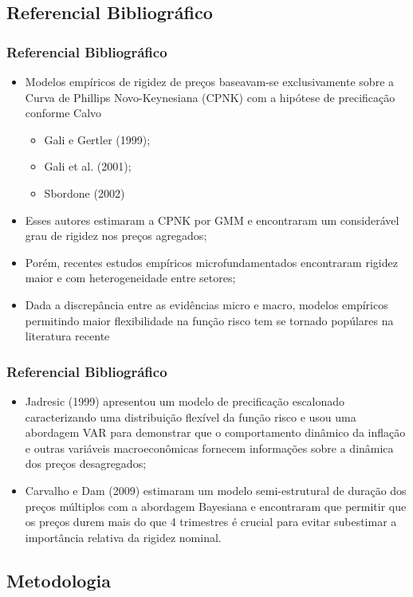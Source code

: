 \documentclass[aspectratio=169]{beamer}
\begin{document}
\subsection{Referencial Bibliográfico}

\begin{frame}\frametitle{Referencial Bibliográfico}
  \begin{itemize}[<+->]
  \item Modelos empíricos de rigidez de preços baseavam-se exclusivamente sobre a Curva de Phillips Novo-Keynesiana (CPNK) com a hipótese de precificação conforme Calvo
    \begin{itemize}
      \item Gali e Gertler (1999);
      \item Gali et al. (2001);
      \item Sbordone (2002)
    \end{itemize}
  \item Esses autores estimaram a CPNK por GMM e encontraram um considerável grau de rigidez nos preços agregados;
  \item Porém, recentes estudos empíricos microfundamentados encontraram rigidez maior e com heterogeneidade entre setores;
  \item Dada a discrepância entre as evidências micro e macro, modelos empíricos permitindo maior flexibilidade na função risco tem se tornado popúlares na literatura recente
  \end{itemize}
\end{frame}

\begin{frame}\frametitle{Referencial Bibliográfico}
  \begin{itemize}[<+->]
  \item Jadresic (1999) apresentou um modelo de precificação escalonado caracterizando uma distribuição flexível da função risco e usou uma abordagem VAR para demonstrar que o comportamento dinâmico da inflação e outras variáveis macroeconômicas fornecem informações sobre a dinâmica dos preços desagregados;
  \item Carvalho e Dam (2009) estimaram um modelo semi-estrutural de duração dos preços múltiplos com a abordagem Bayesiana e encontraram que permitir que os preços durem mais do que 4 trimestres é crucial para evitar subestimar a importância relativa da rigidez nominal.
   \end{itemize}
\end{frame}

\subsection{Metodologia}
\end{document}

